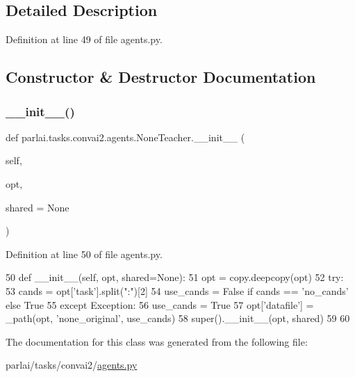 \subsection{Detailed Description}


Definition at line 49 of file agents.\+py.



\subsection{Constructor \& Destructor Documentation}
\mbox{\label{classparlai_1_1tasks_1_1convai2_1_1agents_1_1NoneTeacher_ab4fbfba45b52e37ca3293273880b56e6}} 
\subsubsection{\texorpdfstring{\+\_\+\+\_\+init\+\_\+\+\_\+()}{\_\_init\_\_()}}
{\footnotesize\ttfamily def parlai.\+tasks.\+convai2.\+agents.\+None\+Teacher.\+\_\+\+\_\+init\+\_\+\+\_\+ (\begin{DoxyParamCaption}\item[{}]{self,  }\item[{}]{opt,  }\item[{}]{shared = {\ttfamily None} }\end{DoxyParamCaption})}



Definition at line 50 of file agents.\+py.


\begin{DoxyCode}
50     \textcolor{keyword}{def }\_\_init\_\_(self, opt, shared=None):
51         opt = copy.deepcopy(opt)
52         \textcolor{keywordflow}{try}:
53             cands = opt[\textcolor{stringliteral}{'task'}].split(\textcolor{stringliteral}{":"})[2]
54             use\_cands = \textcolor{keyword}{False} \textcolor{keywordflow}{if} cands == \textcolor{stringliteral}{'no\_cands'} \textcolor{keywordflow}{else} \textcolor{keyword}{True}
55         \textcolor{keywordflow}{except} Exception:
56             use\_cands = \textcolor{keyword}{True}
57         opt[\textcolor{stringliteral}{'datafile'}] = \_path(opt, \textcolor{stringliteral}{'none\_original'}, use\_cands)
58         super().\_\_init\_\_(opt, shared)
59 
60 
\end{DoxyCode}


The documentation for this class was generated from the following file\+:\begin{DoxyCompactItemize}
\item 
parlai/tasks/convai2/\hyperlink{parlai_2tasks_2convai2_2agents_8py}{agents.\+py}\end{DoxyCompactItemize}
